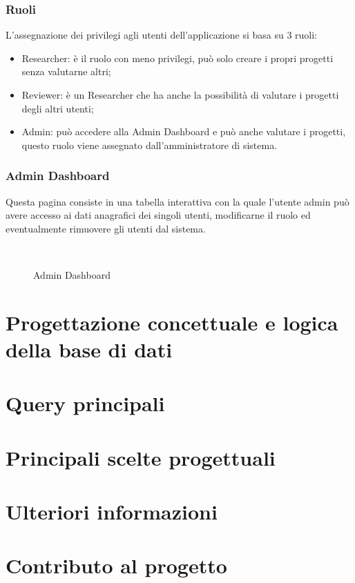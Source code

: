 \documentclass{article}
\begin{document}
\subsubsection{Ruoli}
L'assegnazione dei privilegi agli utenti dell'applicazione si basa su 3 ruoli: 
\begin{itemize}
    \item Researcher: è il ruolo con meno privilegi, può solo creare i propri progetti senza valutarne altri;
    \item Reviewer: è un Researcher che ha anche la possibilità di valutare i progetti degli altri utenti;
    \item Admin: può accedere alla Admin Dashboard e può anche valutare i progetti, questo ruolo viene assegnato dall'amministratore di sistema.
\end{itemize}
\subsubsection{Admin Dashboard}
Questa pagina consiste in una tabella interattiva con la quale l'utente admin può avere accesso ai dati anagrafici dei singoli utenti, modificarne il ruolo ed eventualmente rimuovere gli utenti dal sistema.
\begin{figure}[!h] 
    \centering
    \\
    \caption{Admin Dashboard}
\end{figure}

\section{Progettazione concettuale e logica della base di dati}

\section{Query principali}

\section{Principali scelte progettuali}

\section{Ulteriori informazioni}

\section{Contributo al progetto}
\end{document}
